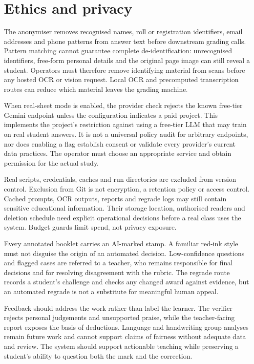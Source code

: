 \section{Ethics and privacy}
\label{sec:ethics}
The anonymiser removes recognised names, roll or registration identifiers, email addresses and phone patterns from answer text before downstream grading calls. Pattern matching cannot guarantee complete de-identification: unrecognised identifiers, free-form personal details and the original page image can still reveal a student. Operators must therefore remove identifying material from scans before any hosted OCR or vision request. Local OCR and precomputed transcription routes can reduce which material leaves the grading machine.

When real-sheet mode is enabled, the provider check rejects the known free-tier Gemini endpoint unless the configuration indicates a paid project. This implements the project's restriction against using a free-tier LLM that may train on real student answers. It is not a universal policy audit for arbitrary endpoints, nor does enabling a flag establish consent or validate every provider's current data practices. The operator must choose an appropriate service and obtain permission for the actual study.

Real scripts, credentials, caches and run directories are excluded from version control. Exclusion from Git is not encryption, a retention policy or access control. Cached prompts, OCR outputs, reports and regrade logs may still contain sensitive educational information. Their storage location, authorised readers and deletion schedule need explicit operational decisions before a real class uses the system. Budget guards limit spend, not privacy exposure.

Every annotated booklet carries an AI-marked stamp. A familiar red-ink style must not disguise the origin of an automated decision. Low-confidence questions and flagged cases are referred to a teacher, who remains responsible for final decisions and for resolving disagreement with the rubric. The regrade route records a student's challenge and checks any changed award against evidence, but an automated regrade is not a substitute for meaningful human appeal.

Feedback should address the work rather than label the learner. The verifier rejects personal judgements and unsupported praise, while the teacher-facing report exposes the basis of deductions. Language and handwriting group analyses remain future work and cannot support claims of fairness without adequate data and review. The system should support actionable teaching while preserving a student's ability to question both the mark and the correction.
